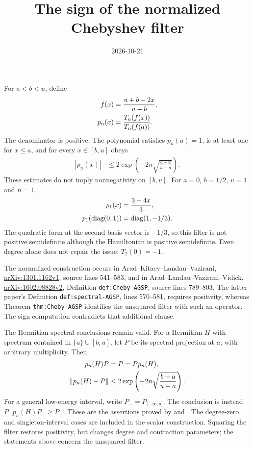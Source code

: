 \documentclass{article}
\title{The sign of the normalized Chebyshev filter}
\author{}
\date{2026-10-21}
\begin{document}
\maketitle
{}

For $a<b<u$, define
\begin{align}
    f(x)&=\frac{u+b-2x}{u-b},\notag\\
    p_n(x)&=\frac{T_n(f(x))}{T_n(f(a))}.
    \label{eq:alvv_chebyshev_normalization}
\end{align}
The denominator is positive. The polynomial satisfies $p_n(a)=1$, is at
least one for $x\le a$, and for every $x\in[b,u]$ obeys
\begin{align}
    |p_n(x)|&\le2\exp\left(-2n\sqrt{\frac{b-a}{u-a}}\right).
    \label{eq:alvv_chebyshev_contraction}
\end{align}
These estimates do not imply nonnegativity on $[b,u]$.
For $a=0$, $b=1/2$, $u=1$ and $n=1$,
\begin{align}
    p_1(x)&=\frac{3-4x}{3},\notag\\
    p_1(\operatorname{diag}(0,1))&=\operatorname{diag}(1,-1/3).\notag
\end{align}
The quadratic form at the second basis vector is $-1/3$, so this filter
is not positive semidefinite although the Hamiltonian is positive semidefinite.
Even degree alone does not repair the issue: $T_2(0)=-1$.

The normalized construction occurs in Arad--Kitaev--Landau--Vazirani,
\href{https://arxiv.org/abs/1301.1162}{arXiv:1301.1162v1}, source lines 541--583,
and in Arad--Landau--Vazirani--Vidick,
\href{https://arxiv.org/abs/1602.08828}{arXiv:1602.08828v2}, Definition
\texttt{def:Cheby-AGSP}, source lines 789--803. The latter paper's Definition
\texttt{def:spectral-AGSP}, lines 570--581, requires positivity, whereas
Theorem \texttt{thm:Cheby-AGSP} identifies the unsquared filter with such
an operator. The sign computation contradicts that additional clause.

The Hermitian spectral conclusions remain valid. For a Hermitian $H$ with
spectrum contained in $\{a\}\cup[b,u]$, let $P$ be its spectral projection
at $a$, with arbitrary multiplicity. Then
\begin{align}
    p_n(H)P&=P=Pp_n(H),\notag\\
    \|p_n(H)-P\|&\le2\exp\left(-2n\sqrt{\frac{b-a}{u-a}}\right).\notag
\end{align}
For a general low-energy interval, write $P_-=P_{(-\infty,a]}$.
The conclusion is instead $P_-p_n(H)P_-\ge P_-$.
These are the assertions proved by
 and
.
The degree-zero and singleton-interval cases are included in the scalar
construction. Squaring the filter restores positivity, but changes degree
and contraction parameters; the statements above concern the unsquared filter.
\end{document}
